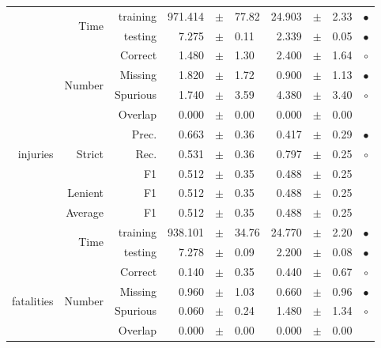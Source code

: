 \begin{longtable}{|r|r|r||rcl|rcl|c|}
\cline{2-10}
  & \multirow{2}{*}{Time} &  training  & 971.414 &  $\pm$  & 77.82 & 24.903 &  $\pm$  & 2.33 &  $\bullet$\\
\cline{3-10}
  &  &  testing  & 7.275 &  $\pm$  & 0.11 & 2.339 &  $\pm$  & 0.05 &  $\bullet$\\
\hline
\hline
\multirow{11}{*}{\begin{sideways}injuries\end{sideways} } & \multirow{4}{*}{Number} &  Correct  & 1.480 &  $\pm$  & 1.30 & 2.400 &  $\pm$  & 1.64 &  $\circ$\\
\cline{3-10}
  &  &  Missing  & 1.820 &  $\pm$  & 1.72 & 0.900 &  $\pm$  & 1.13 &  $\bullet$\\
\cline{3-10}
  &  &  Spurious  & 1.740 &  $\pm$  & 3.59 & 4.380 &  $\pm$  & 3.40 &  $\circ$\\
\cline{3-10}
  &  &  Overlap  & 0.000 &  $\pm$  & 0.00 & 0.000 &  $\pm$  & 0.00 &   \\
\cline{2-10}
  & \multirow{3}{*}{Strict} &  Prec.  & 0.663 &  $\pm$  & 0.36 & 0.417 &  $\pm$  & 0.29 &  $\bullet$\\
\cline{3-10}
  &  &  Rec.  & 0.531 &  $\pm$  & 0.36 & 0.797 &  $\pm$  & 0.25 &  $\circ$\\
\cline{3-10}
  &  &  F1  & 0.512 &  $\pm$  & 0.35 & 0.488 &  $\pm$  & 0.25 &   \\
\cline{2-10}
  & Lenient &  F1  & 0.512 &  $\pm$  & 0.35 & 0.488 &  $\pm$  & 0.25 &   \\
\cline{2-10}
  & Average &  F1  & 0.512 &  $\pm$  & 0.35 & 0.488 &  $\pm$  & 0.25 &   \\
\cline{2-10}
  & \multirow{2}{*}{Time} &  training  & 938.101 &  $\pm$  & 34.76 & 24.770 &  $\pm$  & 2.20 &  $\bullet$\\
\cline{3-10}
  &  &  testing  & 7.278 &  $\pm$  & 0.09 & 2.200 &  $\pm$  & 0.08 &  $\bullet$\\
\hline
\hline
\multirow{11}{*}{\begin{sideways}fatalities\end{sideways} } & \multirow{4}{*}{Number} &  Correct  & 0.140 &  $\pm$  & 0.35 & 0.440 &  $\pm$  & 0.67 &  $\circ$\\
\cline{3-10}
  &  &  Missing  & 0.960 &  $\pm$  & 1.03 & 0.660 &  $\pm$  & 0.96 &  $\bullet$\\
\cline{3-10}
  &  &  Spurious  & 0.060 &  $\pm$  & 0.24 & 1.480 &  $\pm$  & 1.34 &  $\circ$\\
\cline{3-10}
  &  &  Overlap  & 0.000 &  $\pm$  & 0.00 & 0.000 &  $\pm$  & 0.00 &   \\

\end{longtable}
